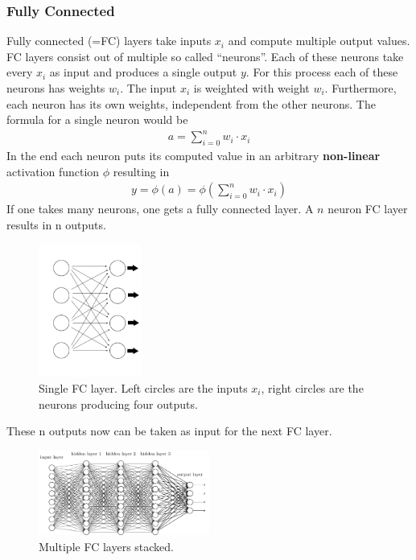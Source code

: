 \documentclass[
     11pt,         %
     a4paper,      %
     oneside,
     ]{article}
\begin{document}
\subsubsection{Fully Connected}
Fully connected (=FC) layers take inputs $x_i$ and compute multiple output values. FC layers consist out of multiple so called \enquote{neurons}. Each of these neurons take every $x_i$ as input and produces a single output $y$. For this process each of these neurons has weights $w_i$. The input $x_i$ is weighted with weight $w_i$. Furthermore, each neuron has its own weights, independent from the other neurons.
The formula for a single neuron would be
\begin{align*}
  a = \sum^n_{i=0} w_i \cdot x_i
\end{align*}
In the end each neuron puts its computed value in an arbitrary \textbf{non-linear} activation function $\phi$ resulting in
\begin{align*}
  y = \phi (a) = \phi ( \sum^n_{i=0} w_i \cdot x_i )
\end{align*}
If one takes many neurons, one gets a fully connected layer. A $n$ neuron FC layer results in n outputs.
\begin{figure}[H]
  \begin{center}
    \includegraphics[width=0.3\textwidth]{images/fc-layer.png}
    \caption{Single FC layer. Left circles are the inputs $x_i$, right circles are the neurons producing four outputs.\cite{FC1}}
    \label{fig:fc-layer}
  \end{center}
\end{figure}

These n outputs now can be taken as input for the next FC layer.\cite{neuralnetworksanddeeplearning}
\begin{figure}[H]
  \begin{center}
    \includegraphics[width=0.5\textwidth]{images/multipleFC.png}
    \caption{Multiple FC layers stacked.\cite{FC2}}
    \label{fig:multipleFC}
  \end{center}
\end{figure}
\end{document}
